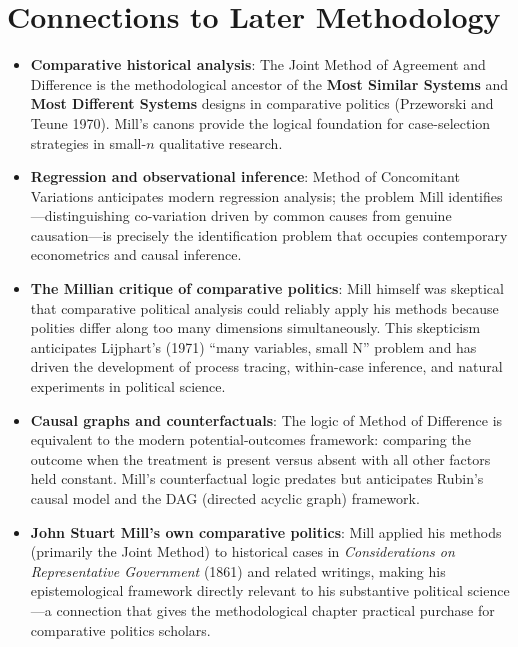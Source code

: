 \documentclass[12pt]{article}
\begin{document}
\section{Connections to Later Methodology}

\begin{itemize}[leftmargin=*, itemsep=4pt]
    \item \textbf{Comparative historical analysis}: The Joint Method of Agreement and Difference is the methodological ancestor of the \textbf{Most Similar Systems} and \textbf{Most Different Systems} designs in comparative politics (Przeworski and Teune 1970). Mill's canons provide the logical foundation for case-selection strategies in small-$n$ qualitative research.
    \item \textbf{Regression and observational inference}: Method of Concomitant Variations anticipates modern regression analysis; the problem Mill identifies---distinguishing co-variation driven by common causes from genuine causation---is precisely the identification problem that occupies contemporary econometrics and causal inference.
    \item \textbf{The Millian critique of comparative politics}: Mill himself was skeptical that comparative political analysis could reliably apply his methods because polities differ along too many dimensions simultaneously. This skepticism anticipates Lijphart's (1971) ``many variables, small N'' problem and has driven the development of process tracing, within-case inference, and natural experiments in political science.
    \item \textbf{Causal graphs and counterfactuals}: The logic of Method of Difference is equivalent to the modern potential-outcomes framework: comparing the outcome when the treatment is present versus absent with all other factors held constant. Mill's counterfactual logic predates but anticipates Rubin's causal model and the DAG (directed acyclic graph) framework.
    \item \textbf{John Stuart Mill's own comparative politics}: Mill applied his methods (primarily the Joint Method) to historical cases in \textit{Considerations on Representative Government} (1861) and related writings, making his epistemological framework directly relevant to his substantive political science---a connection that gives the methodological chapter practical purchase for comparative politics scholars.
\end{itemize}
\end{document}
